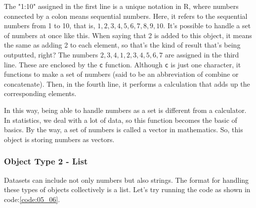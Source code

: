 \documentclass{ltjsbook}
\begin{document}
The "1:10" assigned in the first line is a unique notation in R, where numbers connected by a colon means sequential numbers. Here, it refers to the sequential numbers from 1 to 10, that is, $1,2,3,4,5,6,7,8,9,10$. It's possible to handle a set of numbers at once like this. When saying that 2 is added to this object, it means the same as adding 2 to each element, so that's the kind of result that's being outputted, right?
The numbers $2,3,4,1,2,3,4,5,6,7$ are assigned in the third line. These are enclosed by the \texttt{c} function. Although \texttt{c} is just one character, it functions to make a set of numbers (said to be an abbreviation of combine or concatenate). Then, in the fourth line, it performs a calculation that adds up the corresponding elements.

In this way, being able to handle numbers as a set is different from a calculator. In statistics, we deal with a lot of data, so this function becomes the basic of basics. By the way, a set of numbers is called a vector in mathematics. So, this object is storing numbers as vectors.

\subsubsection{Object Type 2 - List}
Datasets can include not only numbers but also strings. The format for handling these types of objects collectively is a list. Let's try running the code as shown in code:\ref{code:05_06}.


\end{document}

